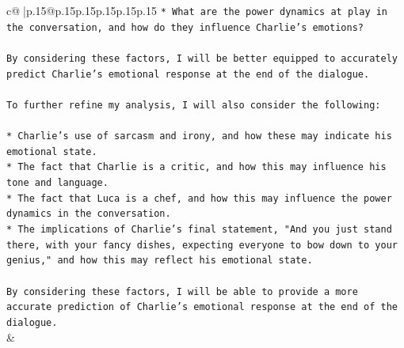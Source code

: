 \documentclass{article}
\begin{document}
{\begin{supertabular}{c@{$\;$}|p{.15\linewidth}@{}p{.15\linewidth}p{.15\linewidth}p{.15\linewidth}p{.15\linewidth}p{.15\linewidth}}
{{{\texttt{* What are the power dynamics at play in the conversation, and how do they influence Charlie's emotions?} \\
\\ 
\texttt{By considering these factors, I will be better equipped to accurately predict Charlie's emotional response at the end of the dialogue.} \\
\\ 
\texttt{To further refine my analysis, I will also consider the following:} \\
\\ 
\texttt{* Charlie's use of sarcasm and irony, and how these may indicate his emotional state.} \\
\texttt{* The fact that Charlie is a critic, and how this may influence his tone and language.} \\
\texttt{* The fact that Luca is a chef, and how this may influence the power dynamics in the conversation.} \\
\texttt{* The implications of Charlie's final statement, "And you just stand there, with your fancy dishes, expecting everyone to bow down to your genius," and how this may reflect his emotional state.} \\
\\ 
\texttt{By considering these factors, I will be able to provide a more accurate prediction of Charlie's emotional response at the end of the dialogue.} \\
            }
        }
    }
    & \\ \\

\end{supertabular}
}
\end{document}
